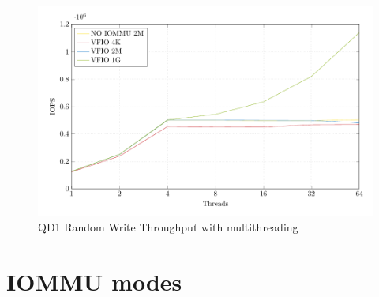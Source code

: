 \begin{figure}
    \centering
    \includegraphics[width=\textwidth]{figures/qd1tnrandwrite}
    \caption{QD1 Random Write Throughput with multithreading}
    \label{fig:qd1tn}
\end{figure}



\section{IOMMU modes}